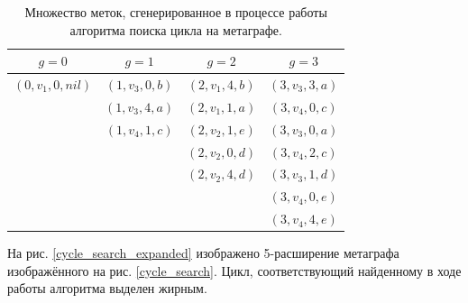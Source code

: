 \documentclass[14pt]{mmcs-article}
\begin{document}
\begin{table}[H]
    \centering
    \begin{tabular}{ | c | c | c | c | }
        \hline
        $g = 0$            & $g = 1$           & $g = 2$           & $g = 3$ \\ \hline
        $(0, v_1, 0, nil)$ & $(1, v_3,  0, b)$ & $(2, v_1,  4, b)$ & $(3, v_3,  3, a)$ \\ \hline
                           & $(1, v_3,  4, a)$ & $(2, v_1,  1, a)$ & $(3, v_4,  0, c)$ \\ \hline
                           & $(1, v_4,  1, c)$ & $(2, v_2,  1, e)$ & $(3, v_3,  0, a)$ \\ \hline
                           &                   & $(2, v_2,  0, d)$ & $(3, v_4,  2, c)$ \\ \hline
                           &                   & $(2, v_2,  4, d)$ & $(3, v_3,  1, d)$ \\ \hline
                           &                   &                   & $(3, v_4,  0, e)$ \\ \hline
                           &                   &                   & $(3, v_4,  4, e)$ \\ \hline
    \end{tabular}
    \caption{ Множество меток, сгенерированное в процессе работы алгоритма поиска цикла на метаграфе. }
    \label{cycle_search_table}
\end{table}

На рис. \ref{cycle_search_expanded} изображено 5-расширение метаграфа изображённого на рис. \ref{cycle_search}. Цикл, соответствующий найденному в ходе работы алгоритма выделен жирным. %
\end{document}
